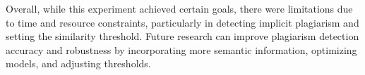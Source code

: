 Overall, while this experiment achieved certain goals, there were limitations due to time and resource constraints, particularly in detecting implicit plagiarism and setting the similarity threshold. Future research can improve plagiarism detection accuracy and robustness by incorporating more semantic information, optimizing models, and adjusting thresholds.
